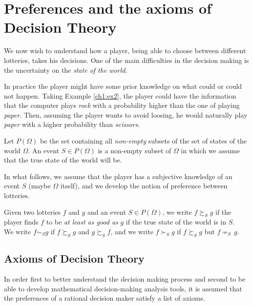\section{Preferences and the axioms of Decision Theory}

We now wish to understand how a player, being able to choose between different lotteries, takes his decisions. One of the main difficulties in the decision making is the uncertainty on the \emph{state of the world}.

In practice the player might have some prior knowledge on what could or could not happen. Taking Example \ref{ch1:ex2}, the player could have the information that the computer plays \emph{rock} with a probability higher than the one of playing \emph{paper}. Then, assuming the player wants to avoid loosing, he would naturally play \emph{paper} with a higher probability than  \emph{scissors}.

\begin{definition}
Let $P(\Omega)$ be the set containing all \emph{non-empty} subsets of the set of states of the world $\Omega$.
An event $S \in P(\Omega)$ is a non-empty subset of $ \Omega $ in which we assume that the true state of the world will be.
\end{definition}

In what follows, we assume that the player has a subjective knowledge of an event $S$ (maybe $\Omega$ itself), and we develop the notion of preference between lotteries.

\begin{notation}[ $\succsim, \, \sim, \, \succ$]
Given two lotteries $f$ and $g$ and an event $S \in P(\Omega)$,
we write $f \succsim_S g$ if the player finds $f$ to be \emph{at least as good as} $g$ if the true state of the world is in $S$. \\
We write $ f \sim_S g $ if $ f \succsim_S g$ and $g \succsim_S f$, and we write  $f \succ_S g$ if $f \succsim_S g$ but $f  {\nsim}_S \, g$.
\end{notation}


\subsection{Axioms of Decision Theory}

In order first to better understand the decision making process and second to be able to develop mathematical decision-making analysis tools, it is assumed that the preferences of a rational decision maker satisfy a list of axioms.

